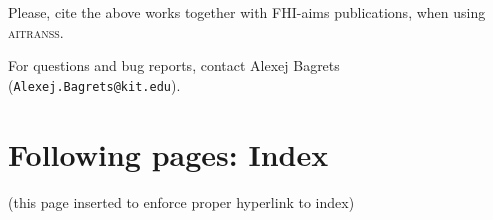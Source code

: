 \documentclass[12pt,a4paper,twoside,openany,titlepage,final]{book}
\begin{document}
Please, cite the above works together with
FHI-aims publications, when using \textsc{aitranss}.

For questions and bug reports, contact
Alexej Bagrets (\verb,Alexej.Bagrets@kit.edu,).



\appendix
























\section*{Following pages: Index}
(this page inserted to enforce proper hyperlink to index)
\printindex
\end{document}
